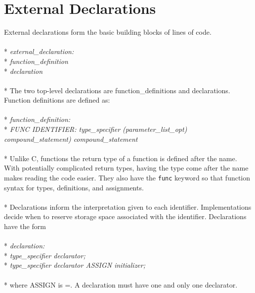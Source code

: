 \documentclass[11pt]{article}
\newcommand{\tab}{\hspace*{2em}}
\begin{document}
\section{External Declarations}
External declarations form the basic building blocks of lines of code.
\\ \\* \tab \emph{external\_declaration:}
\\* \tab \tab \emph{function\_definition}
\\* \tab \tab \emph{declaration}
\\ \\* The two top-level declarations are function\_definitions and declarations. Function definitions are defined as:
\\ \\* \tab \emph{function\_definition:}
\\* \tab \tab \emph{FUNC IDENTIFIER: type\_specifier (parameter\_list\_opt) compound\_statement) compound\_statement}
\\ \\* Unlike C, functions the return type of a function is defined after the name. With potentially complicated return types, having the type come after the name makes reading the code easier. They also have the \verb!func! keyword so that function syntax for types, definitions, and assignments.
\\ \\* Declarations inform the interpretation given to each identifier. Implementations decide when to reserve storage space associated with the identifier. Declarations have the form
\\ \\* \tab \emph{declaration:}
\\* \tab \tab \emph{type\_specifier declarator;}
\\* \tab \tab \emph{type\_specifier declarator ASSIGN initializer;}
\\ \\* where ASSIGN is =. A declaration must have one and only one declarator.
\end{document}
